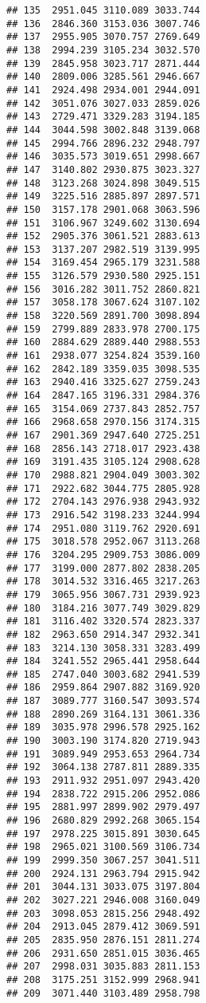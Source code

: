 \documentclass[
]{article}
\begin{document}
\begin{verbatim}
## 135  2951.045 3110.089 3033.744
## 136  2846.360 3153.036 3007.746
## 137  2955.905 3070.757 2769.649
## 138  2994.239 3105.234 3032.570
## 139  2845.958 3023.717 2871.444
## 140  2809.006 3285.561 2946.667
## 141  2924.498 2934.001 2944.091
## 142  3051.076 3027.033 2859.026
## 143  2729.471 3329.283 3194.185
## 144  3044.598 3002.848 3139.068
## 145  2994.766 2896.232 2948.797
## 146  3035.573 3019.651 2998.667
## 147  3140.802 2930.875 3023.327
## 148  3123.268 3024.898 3049.515
## 149  3225.516 2885.897 2897.571
## 150  3157.178 2901.068 3063.596
## 151  3106.967 3249.602 3130.694
## 152  2905.376 3061.521 2883.613
## 153  3137.207 2982.519 3139.995
## 154  3169.454 2965.179 3231.588
## 155  3126.579 2930.580 2925.151
## 156  3016.282 3011.752 2860.821
## 157  3058.178 3067.624 3107.102
## 158  3220.569 2891.700 3098.894
## 159  2799.889 2833.978 2700.175
## 160  2884.629 2889.440 2988.553
## 161  2938.077 3254.824 3539.160
## 162  2842.189 3359.035 3098.535
## 163  2940.416 3325.627 2759.243
## 164  2847.165 3196.331 2984.376
## 165  3154.069 2737.843 2852.757
## 166  2968.658 2970.156 3174.315
## 167  2901.369 2947.640 2725.251
## 168  2856.143 2718.017 2923.438
## 169  3191.435 3105.124 2908.628
## 170  2988.821 2904.049 3003.302
## 171  2922.682 3044.775 2805.928
## 172  2704.143 2976.938 2943.932
## 173  2916.542 3198.233 3244.994
## 174  2951.080 3119.762 2920.691
## 175  3018.578 2952.067 3113.268
## 176  3204.295 2909.753 3086.009
## 177  3199.000 2877.802 2838.205
## 178  3014.532 3316.465 3217.263
## 179  3065.956 3067.731 2939.923
## 180  3184.216 3077.749 3029.829
## 181  3116.402 3320.574 2823.337
## 182  2963.650 2914.347 2932.341
## 183  3214.130 3058.331 3283.499
## 184  3241.552 2965.441 2958.644
## 185  2747.040 3003.682 2941.539
## 186  2959.864 2907.882 3169.920
## 187  3089.777 3160.547 3093.574
## 188  2890.269 3164.131 3061.336
## 189  3035.978 2996.578 2925.162
## 190  3003.190 3174.820 2719.943
## 191  3089.949 2953.653 2964.734
## 192  3064.138 2787.811 2889.335
## 193  2911.932 2951.097 2943.420
## 194  2838.722 2915.206 2952.086
## 195  2881.997 2899.902 2979.497
## 196  2680.829 2992.268 3065.154
## 197  2978.225 3015.891 3030.645
## 198  2965.021 3100.569 3106.734
## 199  2999.350 3067.257 3041.511
## 200  2924.131 2963.794 2915.942
## 201  3044.131 3033.075 3197.804
## 202  3027.221 2946.008 3160.049
## 203  3098.053 2815.256 2948.492
## 204  2913.045 2879.412 3069.591
## 205  2835.950 2876.151 2811.274
## 206  2931.650 2851.015 3036.465
## 207  2998.031 3035.883 2811.153
## 208  3175.251 3152.999 2968.941
## 209  3071.440 3103.489 2958.798

\end{verbatim}
\end{document}
